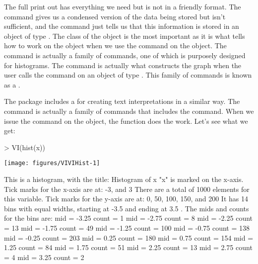 The full print out has everything we need but is not in a friendly format. The  command gives us a condensed version of the data being stored but isn't sufficient, and the  command just tells us that this information is stored in an object of type . The class of the object is the most important as it is what tells \R{} how to work on the object when we use the  command on the  object. The  command is actually a family of commands, one of which is purposely designed for histograms. The  command is actually what constructs the graph when the user calls the  command on an object of type . This family of commands is known as a . 
 
The  package includes a  for creating text interpretations in a similar way. The  command is actually a family of commands that includes the  command. When we issue the  command on the  object, the  function does the work. Let's see what we get: 
\begin{Schunk}
\begin{Sinput}
> VI(hist(x)) 
\end{Sinput}

\texttt{[image: figures/VIVIHist-1]} \begin{Soutput}
This is a histogram, with the title: Histogram of x 
 "x" is marked on the x-axis.
Tick marks for the x-axis are at: -3, and 3 
There are a total of 1000 elements for this variable.
Tick marks for the y-axis are at: 0, 50, 100, 150, and 200 
It has 14 bins with equal widths, starting at -3.5 and ending at 3.5 .
The mids and counts for the bins are:
mid = -3.25  count = 1 
mid = -2.75  count = 8 
mid = -2.25  count = 13 
mid = -1.75  count = 49 
mid = -1.25  count = 100 
mid = -0.75  count = 138 
mid = -0.25  count = 203 
mid = 0.25  count = 180 
mid = 0.75  count = 154 
mid = 1.25  count = 84 
mid = 1.75  count = 51 
mid = 2.25  count = 13 
mid = 2.75  count = 4 
mid = 3.25  count = 2
\end{Soutput}
\end{Schunk}
 
